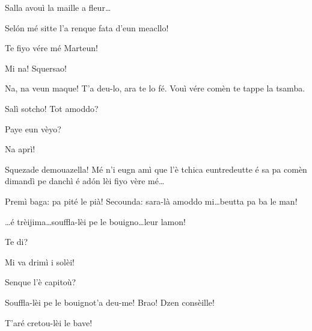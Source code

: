 \begin{drama}
\Marteunspeaks{} Salla avouì la maille a fleur\ldots

\Djouiyaoueunspeaks Sel\'on mé sitte l'a renque fata d'eun meacllo!

\Selmospeaks Te fiyo vére mé Marteun!


\Marteunspeaks Mi na! Squersao!

\Selmospeaks Na, na veun maque! T'a deu-lo, ara te lo fé. Vouì vére comèn te tappe la tsamba.


\Selmospeaks{} Salì sotcho! Tot amoddo?

\Dinospeaks Paye eun vèyo?

\Selmospeaks Na aprì!


\Selmospeaks{} Squezade demouazella! Mé n'i eugn amì que l'è tchica euntredeutte é sa pa comèn dimandì pe danchì é ad\'on lèi fiyo vère mé\ldots


\Selmospeaks Premì baga: pa pité le pià! Secounda: sara-là amoddo mi\ldots beutta pa ba le man!


\Selmospeaks{} \ldots é trèijima\ldots souffla-lèi pe le bouigno\ldots leur lamon!

\Marteunspeaks Te di?



\Ornellaspeaks{} Mi va drimì i solèi!


\Selmospeaks Senque l'è capitoù?

\Marteunspeaks \og Souffla-lèi pe le bouigno\fg t'a deu-me! Brao! Dzen con\-sè\-ille!

\Djouiyaoudouspeaks T'aré cretou-lèi le bave!


\end{drama}
